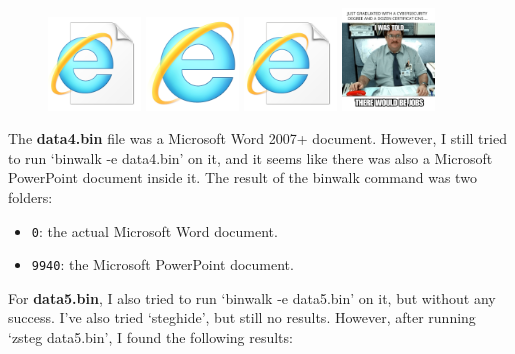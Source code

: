 \documentclass[pdflatex,sn-mathphys-num]{sn-jnl}
\begin{document}
\begin{figure}[htbp]
    \includegraphics[width=0.22\textwidth]{images/97400/image.png}
    \includegraphics[width=0.22\textwidth]{images/A80B8/image.png}
    \includegraphics[width=0.22\textwidth]{images/BC190/image.png}
    \includegraphics[width=0.22\textwidth]{images/CE650/image.png}
    \label{fig:data3_images}
\end{figure}

\par The \textbf{data4.bin} file was a Microsoft Word 2007+ document. However, I still tried to run `binwalk -e data4.bin'
on it, and it seems like there was also a Microsoft PowerPoint document inside it. The result of the binwalk command was
two folders:

\begin{itemize}
    \item \texttt{0}: the actual Microsoft Word document.
    \item \texttt{9940}: the Microsoft PowerPoint document.
\end{itemize}

\par For \textbf{data5.bin}, I also tried to run `binwalk -e data5.bin' on it, but without any success. I've also tried
`steghide', but still no results. However, after running `zsteg data5.bin', I found the following results:
\end{document}
